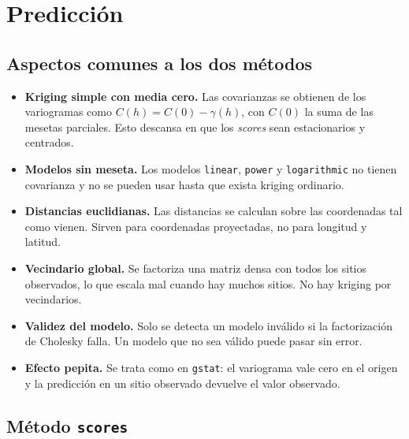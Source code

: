 \documentclass[11pt,a4paper]{article}
\newcommand{\code}[1]{\texttt{#1}}
\begin{document}
\section{Predicción}

\subsection{Aspectos comunes a los dos métodos}

\begin{itemize}
  \item \textbf{Kriging simple con media cero.} Las covarianzas se obtienen de
        los variogramas como $C(h) = C(0) - \gamma(h)$, con $C(0)$ la suma de
        las mesetas parciales. Esto descansa en que los \emph{scores} sean
        estacionarios y centrados.
  \item \textbf{Modelos sin meseta.} Los modelos \code{linear}, \code{power}
        y \code{logarithmic} no tienen covarianza y no se pueden usar hasta
        que exista kriging ordinario.
  \item \textbf{Distancias euclidianas.} Las distancias se calculan sobre las
        coordenadas tal como vienen. Sirven para coordenadas proyectadas, no
        para longitud y latitud.
  \item \textbf{Vecindario global.} Se factoriza una matriz densa con todos
        los sitios observados, lo que escala mal cuando hay muchos sitios. No
        hay kriging por vecindarios.
  \item \textbf{Validez del modelo.} Solo se detecta un modelo inválido si la
        factorización de Cholesky falla. Un modelo que no sea válido puede
        pasar sin error.
  \item \textbf{Efecto pepita.} Se trata como en \code{gstat}: el variograma
        vale cero en el origen y la predicción en un sitio observado devuelve
        el valor observado.
\end{itemize}

\subsection{Método \code{scores}}
\end{document}
